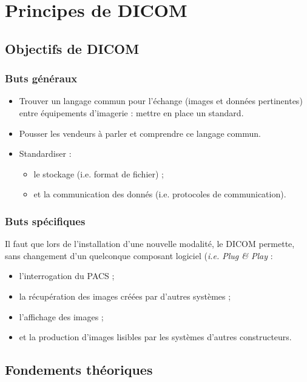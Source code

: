 \section{Principes de DICOM}

	\subsection{Objectifs de DICOM}
	
	\frame
	{
		\frametitle{Buts g\'en\'eraux}
		\begin{itemize}
			\item Trouver un langage commun pour l'\'echange (images et donn\'ees pertinentes) entre \'equipements d'imagerie : mettre en place un standard.
			\item Pousser les vendeurs \`a parler et comprendre ce langage commun.
			\item Standardiser :
			\begin{itemize}
				\item le stockage (i.e. format de fichier) ;
				\item et la communication des donn\'es (i.e. protocoles de communication).
			\end{itemize}
		\end{itemize}
	}
	
	\frame
	{
		\frametitle{Buts sp\'ecifiques}
		
		Il faut que lors de l'installation d'une nouvelle modalit\'e, le DICOM permette, sans changement d'un quelconque composant logiciel (\emph{i.e. Plug \& Play} :
		\begin{itemize}
			\item l'interrogation du PACS ;
			\item la r\'ecup\'eration des images cr\'e\'ees par d'autres syst\`emes ;
			\item l'affichage des images ;
			\item et la production d'images lisibles par les syst\`emes d'autres constructeurs.
		\end{itemize}
	}

	\subsection{Fondements th\'eoriques}

